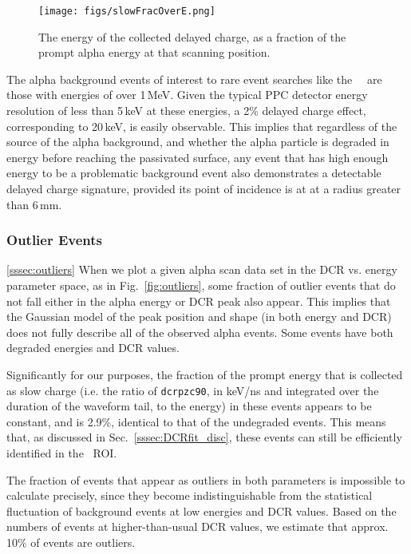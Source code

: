 \documentclass[groupedaddress,rmp,amsmath,amssymb,bibnotes,altaffilletter,twocolumn]{revtex4-1}
\begin{document}
\begin{figure}[]
 \centering
 \texttt{[image: figs/slowFracOverE.png]}
 \caption{The energy of the collected delayed charge, as a fraction of the prompt alpha energy at that scanning position.} 
 \label{fig:Efrac}
\end{figure}

The alpha background events of interest to rare event searches like the \MJ\ \DEM\ are those with energies of over 1\,MeV. Given the typical PPC detector energy resolution of less than 5\,keV at these energies, a 2\% delayed charge effect, corresponding to 20\,keV, is easily observable. This implies that regardless of the source of the alpha background, and whether the alpha particle is degraded in energy before reaching the passivated surface, any event that has high enough energy to be a problematic background event also demonstrates a detectable delayed charge signature, provided its point of incidence is at at a radius greater than 6\,mm. 

\subsubsection{Outlier Events}\ref{sssec:outliers}
When we plot a given alpha scan data set in the DCR vs. energy parameter space, as in Fig.~\ref{fig:outliers}, some fraction of outlier events that do not fall either in the alpha energy or DCR peak also appear. This implies that the Gaussian model of the peak position and shape (in both energy and DCR) does not fully describe all of the observed alpha events. Some events have both degraded energies and DCR values. 

Significantly for our purposes, the fraction of the prompt energy that is collected as slow charge (i.e. the ratio of {\tt dcrpzc90}, in keV/ns and integrated over the duration of the waveform tail, to the energy) in these events appears to be constant, and is 2.9\%, identical to that of the undegraded events. This means that, as discussed in Sec.~\ref{sssec:DCRfit_disc}, these events can still be efficiently identified in the \nonubb\ ROI.

The fraction of events that appear as outliers in both parameters is impossible to calculate precisely, since they become indistinguishable from the statistical fluctuation of background events at low energies and DCR values. Based on the numbers of events at higher-than-usual DCR values, we estimate that approx. 10\% of events are outliers. 
\end{document}
